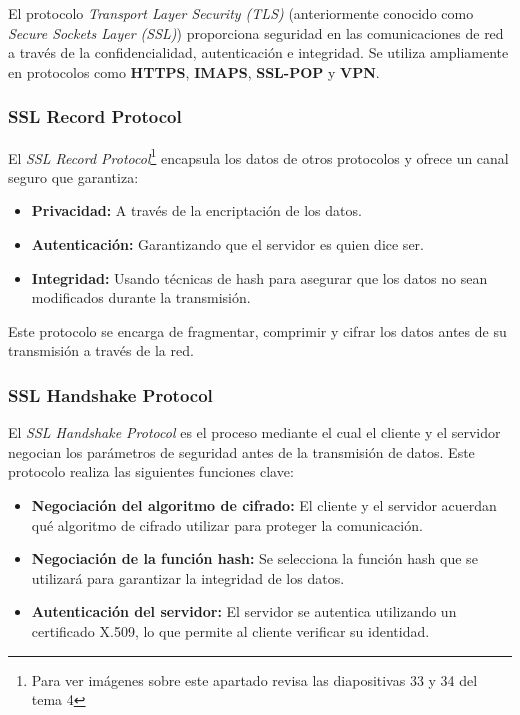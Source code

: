 \documentclass[a4paper,12pt]{article}
\begin{document}
El protocolo \textit{Transport Layer Security (TLS)} (anteriormente conocido como \textit{Secure Sockets Layer (SSL)}) proporciona seguridad en las comunicaciones de red a través de la confidencialidad, autenticación e integridad. Se utiliza ampliamente en protocolos como \textbf{HTTPS}, \textbf{IMAPS}, \textbf{SSL-POP} y \textbf{VPN}.

\subsubsection{SSL Record Protocol}

El \textit{SSL Record Protocol}\footnote{Para ver imágenes sobre este apartado revisa las diapositivas 33 y 34 del tema 4} encapsula los datos de otros protocolos y ofrece un canal seguro que garantiza:

\begin{itemize}
    \item \textbf{Privacidad:} A través de la encriptación de los datos.
    \item \textbf{Autenticación:} Garantizando que el servidor es quien dice ser.
    \item \textbf{Integridad:} Usando técnicas de hash para asegurar que los datos no sean modificados durante la transmisión.
\end{itemize}

Este protocolo se encarga de fragmentar, comprimir y cifrar los datos antes de su transmisión a través de la red.

\subsubsection{SSL Handshake Protocol}

El \textit{SSL Handshake Protocol} es el proceso mediante el cual el cliente y el servidor negocian los parámetros de seguridad antes de la transmisión de datos. Este protocolo realiza las siguientes funciones clave:

\begin{itemize}
    \item \textbf{Negociación del algoritmo de cifrado:} El cliente y el servidor acuerdan qué algoritmo de cifrado utilizar para proteger la comunicación.
    \item \textbf{Negociación de la función hash:} Se selecciona la función hash que se utilizará para garantizar la integridad de los datos.
    \item \textbf{Autenticación del servidor:} El servidor se autentica utilizando un certificado X.509, lo que permite al cliente verificar su identidad.
\end{itemize}
\end{document}
